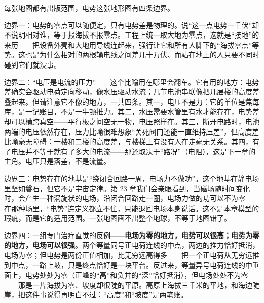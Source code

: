 \begin{mainline}
每张地图都有出版范围，电势这张地形图有四条边界。

边界一：电势的零点可以随便定，只有电势差是物理的。说“这一点电势一千伏”却不说明相对谁，等于报海拔不报零点。工程上统一取大地为零点，这就是“接地”的来历——把设备外壳和大地用导线连起来，强行让它和所有人脚下的“海拔零点”等势。这也是为什么相对的两根输电线之间差几十万伏、而站在地上的人只要不同时碰到它们就没事。

边界二：“电压是电流的压力”——这个比喻用在哪里会翻车。它有用的地方：电势差确实会驱动电荷定向移动，像水压驱动水流；几节电池串联像把几层楼的高度差叠起来。但请注意它不像的地方，一共四条。其一，电压不是力：它的单位是焦每库，是一记账目，不是一牛顿推力。其二，水压需要水管里有水才能存在，电势差却可以横跨真空——平行板之间空无一物，电压照样在。其三，断开电路时，电池两端的电压依然存在，压力比喻很难想象“关死阀门还能一直维持压差”，但高度差比喻毫无障碍：一楼和二楼的高度差，与楼梯上有没有人在走毫无关系。其四，有了电压并不等于就有了多大的电流——那还取决于“路况”（电阻），这是下一章的主角。电压只是落差，不是流量。

边界三：电势存在的地基是“绕闭合回路一周，电场力不做功”。这个地基在静电场里坚如磐石，但它不是宇宙定律。第 23 章我们会亲眼看到，当磁场随时间变化时，会产生一种涡旋状的电场，沿闭合回路走一圈，电场力做的功可以不为零——在那种场里，“电势”连定义都立不住，只能退回电场本身说话。这不是本章模型的瑕疵，而是它的适用范围。一张地图画不出整个地球，不等于地图错了。

边界四：一组专门治疗直觉的反例——\textbf{电场为零的地方，电势可以很高；电势为零的地方，电场可以很强}。两个等量同号正电荷连线的中点，两边的推力恰好抵消，电场为零；但电势是两份正值相加，比无穷远高得多——把一个正电荷从无穷远推到中点，一路上坡，只是终点恰好是一块平台。反过来，等量异号电荷连线的中垂面上，电势处处为零（正峰的“高”和负井的“深”恰好抵消），但电场处处不为零——那是一片海拔为零、坡度却很陡的平原。高原上海拔三千米的平地，和海边陡崖，把这件事说得再明白不过：“高度”和“坡度”是两笔账。
\end{mainline}


